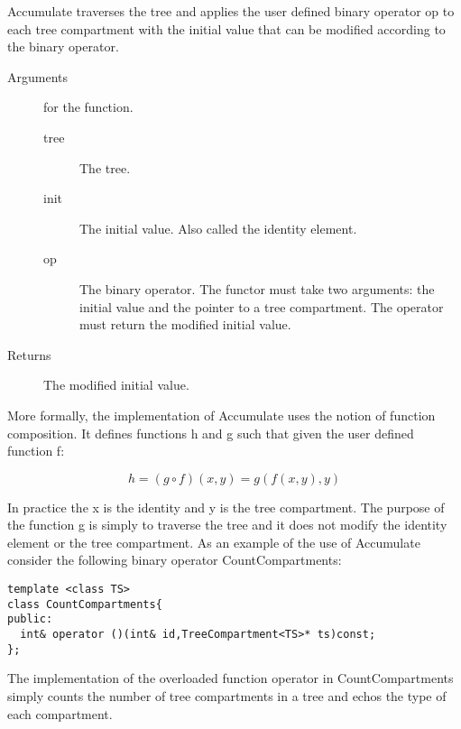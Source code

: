 Accumulate traverses  the tree  and  applies the user  defined  binary
operator op to each  tree compartment with the  initial value that can
be modified according to the binary operator.

\begin{description}
   \item [Arguments] for the function.
     \begin{description}
        \item [tree] The tree.
        \item [init] The initial value. Also called the identity
     element.
        \item [op] The binary operator. The functor must take two
     arguments: the initial value and the pointer to a tree compartment. The
     operator must return the modified initial value.
     \end{description} 
   \item[Returns] The  modified initial value.
\end{description} 

More formally, the implementation of Accumulate uses the notion of
function composition. It defines functions h and g such that given the
user defined function f:

\begin{displaymath}
h = (g \circ f)(x,y) =  g(f(x,y),y)
\end{displaymath}

In practice the x is the  identity and y  is the tree compartment. The
purpose of the function g  is simply to  traverse the tree and it does
not modify the identity element or the tree compartment. As an example
of   the use  of  Accumulate  consider  the  following binary operator
CountCompartments:

\begin{verbatim}
template <class TS>
class CountCompartments{
public:
  int& operator ()(int& id,TreeCompartment<TS>* ts)const;
};
\end{verbatim}

The implementation of the overloaded function operator in
CountCompartments  simply counts the number  of tree compartments in a
tree and echos the type of each compartment.










